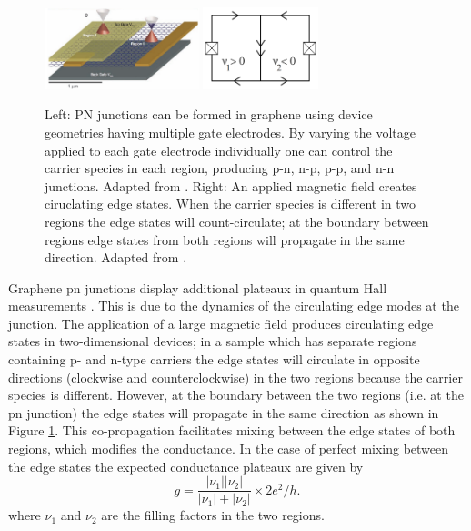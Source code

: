 \documentclass[edeposit,fullpage,draftthesis]{uiucthesis2009}
\begin{document}
            \begin{figure}
            \centering
            \includegraphics[width=0.4\textwidth]{images/background/multigate_pn.png}
            \includegraphics[width=0.3\textwidth]{images/background/pn_edge_states.png}
            \caption[PN junctions in graphene and edge states]{
            Left: PN junctions can be formed in graphene using device geometries having multiple
            gate electrodes. By varying the voltage applied to each gate electrode individually
            one can control the carrier species in each region, producing p-n, n-p, p-p, and n-n 
            junctions.
            Adapted from \cite{williams2007quantum}.
            Right: An applied magnetic field creates ciruclating edge states. When the carrier
            species is different in two regions the edge states will count-circulate; at the
            boundary between regions edge states from both regions will propagate in the same
            direction. Adapted from \cite{williams2007quantum}.
            }
            \label{fig:multigate_pn}
            \end{figure}
            
        Graphene pn junctions display additional plateaux in quantum Hall measurements \cite{williams2007quantum}.
        This is due to the dynamics of the circulating edge modes at the junction.
        The application of a large magnetic field produces circulating edge states in two-dimensional devices;
        in a sample which has separate regions containing p- and n-type carriers
        the edge states will circulate in opposite directions (clockwise and counterclockwise) in the two regions
        because the carrier species is different. However, at the boundary
        between the two regions (i.e. at the pn junction) the edge states will propagate in the
        same direction as shown in Figure \ref{fig:multigate_pn}. 
        This co-propagation facilitates mixing between the edge states of both regions,
        which modifies the conductance. In the case of perfect mixing between the edge states the expected
        conductance plateaux are given by \cite{williams2007quantum}
        \begin{equation}
            g = \frac{|\nu_1| |\nu_2|}{|\nu_1| + |\nu_2|} \times 2 e^2 / h.
        \end{equation}
        where $\nu_1$ and $\nu_2$ are the filling factors in the two regions.
            
\end{document}

